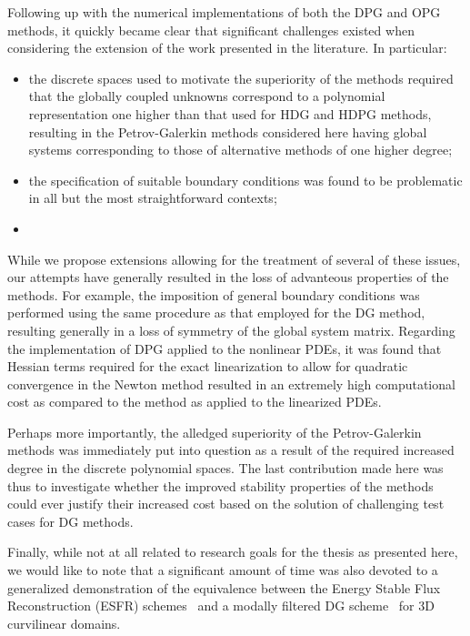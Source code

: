 Following up with the numerical implementations of both the DPG and OPG methods, it quickly
became clear that significant challenges existed when considering the extension
of the work presented in the literature. In particular:
\begin{itemize}
\item the discrete spaces used to motivate the superiority of the methods
  required that the globally coupled unknowns correspond to a polynomial
  representation one higher than that used for HDG and HDPG methods,
  resulting in the Petrov-Galerkin methods considered here having global systems corresponding
  to those of alternative methods of one higher degree; %
\item the specification of suitable boundary conditions was found to be problematic
  in all but the most straightforward contexts;
\item {}
\end{itemize}

While we propose extensions allowing for the treatment of several of these
issues, our attempts have generally resulted in the loss of advanteous
properties of the methods. For example, the imposition of general boundary
conditions was performed using the same procedure as that employed for the DG
method, resulting generally in a loss of symmetry of the global system matrix.
Regarding the implementation of DPG applied to the nonlinear PDEs, it was found
that Hessian terms required for the exact linearization to allow for quadratic
convergence in the Newton method resulted in an extremely high computational
cost as compared to the method as applied to the linearized PDEs.

Perhaps more importantly, the alledged superiority of the Petrov-Galerkin
methods was immediately put into question as a result of the required increased
degree in the discrete polynomial spaces. The last contribution made here was
thus to investigate whether the improved stability properties of the methods
could ever justify their increased cost based on the solution of challenging
test cases for DG methods.

Finally, while not at all related to research goals for the thesis as presented
here, we would like to note that a significant amount of time was also devoted
to a generalized demonstration of the equivalence between the Energy Stable Flux
Reconstruction (ESFR) schemes~\cite{Vincent2011,Williams2014a} and a modally
filtered DG scheme~\cite{Zwanenburg2016} for 3D curvilinear domains.

